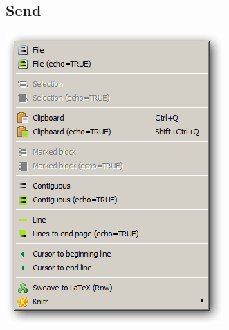 \hypertarget{menu_r_send}{}
\subsection{Send}

\includegraphics[scale=0.50]{./res/menu_r_send.png}\\

